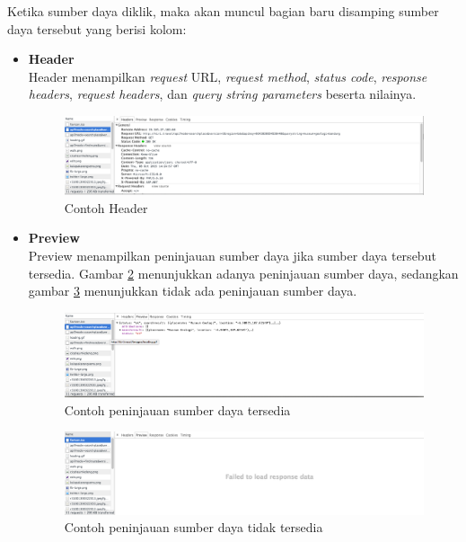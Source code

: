 Ketika sumber daya diklik, maka akan muncul bagian baru disamping sumber daya tersebut yang berisi kolom:
\begin{itemize}
	\item \textbf{Header}\\
			Header menampilkan \textit{request} URL, \textit{request method}, \textit{status code}, \textit{response headers}, \textit{request headers}, dan \textit{query string parameters} beserta nilainya.
			\begin{figure}[H]
				\centering
				\includegraphics[scale=0.3]{Gambar/devtools-network-header}
				\caption{Contoh Header} 
				\label{fig:2_devtools_network_header}
			\end{figure}
	\item \textbf{Preview}\\
			Preview menampilkan peninjauan sumber daya jika sumber daya tersebut tersedia. Gambar \ref{fig:2_devtools_network_preview_a} menunjukkan adanya peninjauan sumber daya, sedangkan gambar \ref{fig:2_devtools_network_preview_b} menunjukkan tidak ada peninjauan sumber daya.
			
			\begin{figure}[H]
				\centering
				\includegraphics[scale=0.3]{Gambar/devtools-network-preview-a}
				\caption{Contoh peninjauan sumber daya tersedia} 
				\label{fig:2_devtools_network_preview_a}
			\end{figure}
			
			\begin{figure}[H]
				\centering
				\includegraphics[scale=0.3]{Gambar/devtools-network-preview-b}
				\caption{Contoh peninjauan sumber daya tidak tersedia} 
				\label{fig:2_devtools_network_preview_b}
			\end{figure}
			

\end{itemize}
